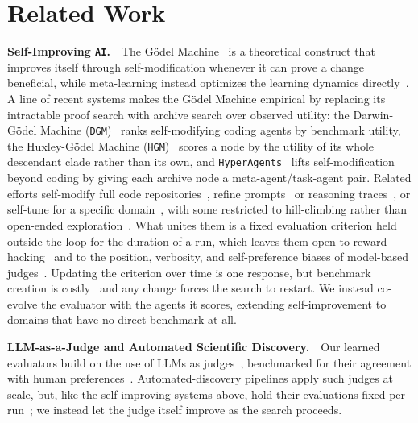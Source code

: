 \documentclass{paper}
\newcommand{\AI}{\texttt{AI}}
\newcommand{\hgm}{\texttt{HGM}\xspace}
\newcommand{\dgm}{\texttt{DGM}\xspace}
\newcommand{\hyperagents}{\texttt{HyperAgents}\xspace}
\begin{document}
\section{Related Work}
\label{sec:related}
\noindent\textbf{Self-Improving \AI.}~~The G\"odel Machine~\citep{good1966speculations,schmidhuber2003godel} is a theoretical construct that improves itself through self-modification whenever it can prove a change beneficial, while meta-learning instead optimizes the learning dynamics directly~\citep{kirsch2022eliminating,lu2023arbitrary}. A line of recent systems makes the G\"odel Machine empirical by replacing its intractable proof search with archive search over observed utility: the Darwin-G\"odel Machine (\dgm)~\citep{zhang2025darwin} ranks self-modifying coding agents by benchmark utility, the Huxley-G\"odel Machine (\hgm)~\citep{wang2025huxley} scores a node by the utility of its whole descendant clade rather than its own, and \hyperagents~\citep{zhang2026hyperagents} lifts self-modification beyond coding by giving each archive node a meta-agent/task-agent pair. Related efforts self-modify full code repositories~\citep{xia2025live,zelikman2024self,yin2025godel}, refine prompts~\citep{fernando2023promptbreeder} or reasoning traces~\citep{zelikman2022star}, or self-tune for a specific domain~\citep{shen2026star}, with some restricted to hill-climbing rather than open-ended exploration~\citep{robeyns2025self}. What unites them is a fixed evaluation criterion held outside the loop for the duration of a run, which leaves them open to reward hacking~\citep{skalse2022defining} and to the position, verbosity, and self-preference biases of model-based judges~\citep{zheng2023judging,dubois2024lengthcontrolled,DBLP:conf/nips/PanicksseryBF24}. Updating the criterion over time is one response, but benchmark creation is costly~\citep{DBLP:journals/corr/abs-2603-25681,DBLP:journals/corr/abs-2203-04592} and any change forces the search to restart. We instead co-evolve the evaluator with the agents it scores, extending self-improvement to domains that have no direct benchmark at all.

\noindent\textbf{LLM-as-a-Judge and Automated Scientific Discovery.}~~Our learned evaluators build on the use of LLMs as judges~\citep{zheng2023judging,zhuge2024agent}, benchmarked for their agreement with human preferences~\citep{zhao2026apres}. Automated-discovery pipelines apply such judges at scale, but, like the self-improving systems above, hold their evaluations fixed per run~\citep{lu2024ai,yamada2025ai,gottweis2025coscientist,ghareeb2026robin,novikov2025alphaevolve,romera2024mathematical}; we instead let the judge itself improve as the search proceeds.
\end{document}
